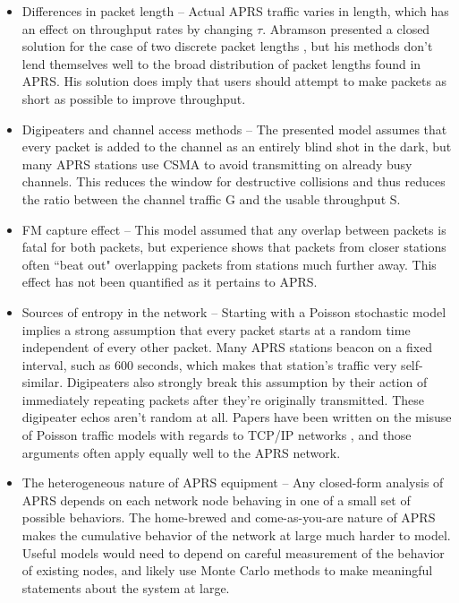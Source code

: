 \begin{itemize}
	\item Differences in packet length -- Actual APRS traffic varies in length,
		which has an effect on throughput rates by changing $\tau$.
		Abramson presented a closed solution for the
		case of two discrete packet lengths \cite{packetthroughput},
		but his methods don't lend themselves well to the broad distribution
		of packet lengths found in APRS.
		His solution does imply that users should attempt to 
		make packets as short as possible to improve throughput.
	\item Digipeaters and channel access methods -- The presented model assumes that
		every packet is added to the channel as an entirely blind shot in the dark,
		but many APRS stations use CSMA to avoid transmitting on already busy channels.
		This reduces the window for destructive collisions and thus reduces the ratio
		between the channel traffic G and the usable throughput S.
	\item FM capture effect -- This model assumed that any overlap between
		packets is fatal for both packets, but experience shows that packets
		from closer stations often ``beat out" overlapping packets from stations
		much further away. This effect has not been quantified as it pertains to
		APRS.
	\item Sources of entropy in the network -- Starting with a Poisson stochastic model
		implies a strong assumption that every packet starts at a random time independent
		of every other packet. Many APRS stations beacon on a fixed interval,
		such as 600 seconds, which makes that station's traffic very self-similar.
		Digipeaters also strongly break this assumption by their action of immediately
		repeating packets after they're originally transmitted.
		These digipeater echos aren't random at all.
		Papers have been written on the misuse of Poisson traffic models with regards
		to TCP/IP networks \cite{failureofpoisson}, and those arguments often apply
		equally well to the APRS network.
	\item The heterogeneous nature of APRS equipment -- Any closed-form analysis
		of APRS depends on each network node behaving in one of a small set 
		of possible behaviors. The home-brewed and come-as-you-are nature of APRS
		makes the cumulative behavior of the network at large much harder to model.
		Useful models would need to depend on careful measurement of the behavior of
		existing nodes, and likely use Monte Carlo methods to make meaningful
		statements about the system at large.
\end{itemize}

